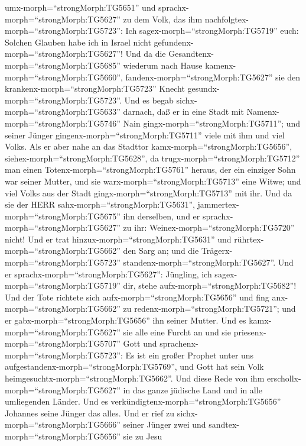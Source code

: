 umx-morph=``strongMorph:TG5651'' und
sprachx-morph=``strongMorph:TG5627'' zu dem Volk, das ihm
nachfolgtex-morph=``strongMorph:TG5723'': Ich
sagex-morph=``strongMorph:TG5719'' euch: Solchen Glauben habe ich in
Israel nicht gefundenx-morph=``strongMorph:TG5627''!  Und
da die Gesandtenx-morph=``strongMorph:TG5685'' wiederum nach Hause
kamenx-morph=``strongMorph:TG5660'',
fandenx-morph=``strongMorph:TG5627'' sie den
krankenx-morph=``strongMorph:TG5723'' Knecht
gesundx-morph=``strongMorph:TG5723''.  Und es begab
sichx-morph=``strongMorph:TG5633'' darnach, daß er in eine Stadt mit
Namenx-morph=``strongMorph:TG5746'' Nain
gingx-morph=``strongMorph:TG5711''; und seiner Jünger
gingenx-morph=``strongMorph:TG5711'' viele mit ihm und viel Volks.
 Als er aber nahe an das Stadttor
kamx-morph=``strongMorph:TG5656'', siehex-morph=``strongMorph:TG5628'',
da trugx-morph=``strongMorph:TG5712'' man einen
Totenx-morph=``strongMorph:TG5761'' heraus, der ein einziger Sohn war
seiner Mutter, und sie warx-morph=``strongMorph:TG5713'' eine Witwe; und
viel Volks aus der Stadt gingx-morph=``strongMorph:TG5713'' mit ihr.
 Und da sie der HERR sahx-morph=``strongMorph:TG5631'',
jammertex-morph=``strongMorph:TG5675'' ihn derselben, und er
sprachx-morph=``strongMorph:TG5627'' zu ihr:
Weinex-morph=``strongMorph:TG5720'' nicht!  Und er trat
hinzux-morph=``strongMorph:TG5631'' und
rührtex-morph=``strongMorph:TG5662'' den Sarg an; und die
Trägerx-morph=``strongMorph:TG5723''
standenx-morph=``strongMorph:TG5627''. Und er
sprachx-morph=``strongMorph:TG5627'': Jüngling, ich
sagex-morph=``strongMorph:TG5719'' dir, stehe
aufx-morph=``strongMorph:TG5682''!  Und der Tote richtete
sich aufx-morph=``strongMorph:TG5656'' und fing
anx-morph=``strongMorph:TG5662'' zu redenx-morph=``strongMorph:TG5721'';
und er gabx-morph=``strongMorph:TG5656'' ihn seiner Mutter.
 Und es kamx-morph=``strongMorph:TG5627'' sie alle eine
Furcht an und sie priesenx-morph=``strongMorph:TG5707'' Gott und
sprachenx-morph=``strongMorph:TG5723'': Es ist ein großer Prophet unter
uns aufgestandenx-morph=``strongMorph:TG5769'', und Gott hat sein Volk
heimgesuchtx-morph=``strongMorph:TG5662''.  Und diese Rede
von ihm erschollx-morph=``strongMorph:TG5627'' in das ganze jüdische
Land und in alle umliegenden Länder.  Und es
verkündigtenx-morph=``strongMorph:TG5656'' Johannes seine Jünger das
alles. Und er rief zu sichx-morph=``strongMorph:TG5666'' seiner Jünger
zwei  und sandtex-morph=``strongMorph:TG5656'' sie zu Jesu
